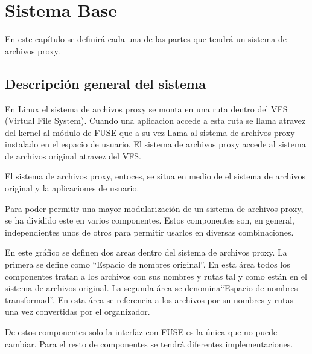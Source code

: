 \chapter{Sistema Base}
\ifpdf
    \graphicspath{{Chapter1/Chapter1Figs/PNG/}{Chapter1/Chapter1Figs/PDF/}{Chapter1/Chapter1Figs/}}
\else
    \graphicspath{{Chapter1/Chapter1Figs/EPS/}{Chapter1/Chapter1Figs/}}
\fi

En este capítulo se definirá cada una de las partes que tendrá un sistema de archivos proxy.

\section{Descripción general del sistema}

En Linux el sistema de archivos proxy se monta en una ruta dentro del VFS (Virtual File System). Cuando una aplicacion accede a esta ruta se llama atravez del kernel al módulo de FUSE que a su vez llama al sistema de archivos proxy instalado en el espacio de usuario. El sistema de archivos proxy accede al sistema de archivos original atravez del VFS.


El sistema de archivos proxy, entoces, se situa en medio de el sistema de archivos original y la aplicaciones de usuario.


Para poder permitir una mayor modularización de un sistema de archivos proxy, se ha dividido este en varios componentes. Estos componentes son, en general, independientes unos de otros para permitir usarlos en diversas combinaciones.


En este gráfico se definen dos areas dentro del sistema de archivos proxy. La primera se define como ``Espacio de nombres original''. En esta área todos los componentes tratan a los archivos con sus nombres y rutas tal y como están en el sistema de archivos original. La segunda área se denomina``Espacio de nombres transformad''. En esta área se referencia a los archivos por su nombres y rutas una vez convertidas por el organizador.

De estos componentes solo la interfaz con FUSE es la única que no puede cambiar. Para el resto de componentes se tendrá diferentes implementaciones.


